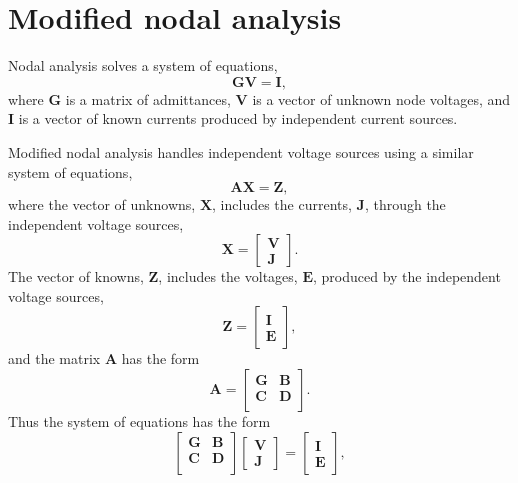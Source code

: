 \documentclass[a4paper, 12pt]{article}
\newcommand{\mat}[1]{\mathbf{#1}}
\renewcommand{\vec}[1]{\mathbf{#1}}
\begin{document}
\section{Modified nodal analysis}

Nodal analysis solves a system of equations,
%
\begin{equation}
  \mat{G} \vec{V} = \vec{I},
\end{equation}
%
where $\mat{G}$ is a matrix of admittances, $\vec{V}$ is a vector of
unknown node voltages, and $\vec{I}$ is a vector of known currents
produced by independent current sources.

Modified nodal analysis handles independent voltage sources using a
similar system of equations,
%
\begin{equation}
  \mat{A} \vec{X} = \vec{Z},
\end{equation}
%
where the vector of unknowns, $\vec{X}$, includes the currents,
$\vec{J}$, through the independent voltage sources,
%
\begin{equation}
  \mat{X} =   
  \begin{bmatrix}
    \vec{V} \\ \vec{J}
  \end{bmatrix}.
\end{equation}
%
The vector of knowns, $\vec{Z}$, includes the voltages, $\vec{E}$,
produced by the independent voltage sources,
%
\begin{equation}
    \mat{Z} =   
  \begin{bmatrix}
    \vec{I} \\ \vec{E}
  \end{bmatrix},
\end{equation}
%
and the matrix $\mat{A}$ has the form
%
\begin{equation}
  \mat{A} =
  \begin{bmatrix}
    \mat{G} & \mat{B} \\
    \mat{C} & \mat{D} \\
  \end{bmatrix}.
\end{equation}
%
Thus the system of equations has the form
%
\begin{equation}
  \begin{bmatrix}
    \mat{G} & \mat{B} \\
    \mat{C} & \mat{D} \\
  \end{bmatrix}
  \begin{bmatrix}
    \vec{V} \\ \vec{J}
  \end{bmatrix}
=
  \begin{bmatrix}
    \vec{I} \\ \vec{E}
  \end{bmatrix},
\end{equation}
\end{document}
